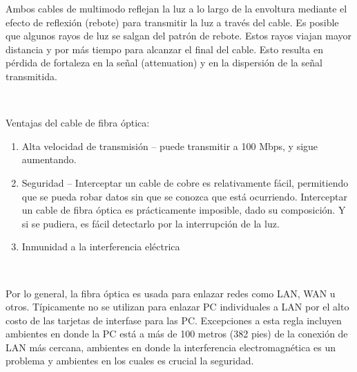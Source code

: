 \documentclass[a4paper]{article}
\begin{document}
Ambos cables de multimodo reflejan la luz a lo largo de la envoltura
mediante el efecto de reflexión (rebote) para transmitir la luz a través
del cable. Es posible que algunos rayos de luz se salgan del patrón de
rebote. Estos rayos viajan mayor distancia y por más tiempo para
alcanzar el final del cable. Esto resulta en pérdida de fortaleza en la
señal (attenuation) y en la dispersión de la señal transmitida.

~

Ventajas del cable de fibra óptica:

\begin{enumerate}
\def\labelenumi{\arabic{enumi}.}
\item
  Alta velocidad de transmisión -- puede transmitir a 100 Mbps, y sigue
  aumentando.
\item
  Seguridad -- Interceptar un cable de cobre es relativamente fácil,
  permitiendo que se pueda robar datos sin que se conozca que está
  ocurriendo. Interceptar un cable de fibra óptica es prácticamente
  imposible, dado su composición. Y si se pudiera, es fácil detectarlo
  por la interrupción de la luz.
\item
  Inmunidad a la interferencia eléctrica
\end{enumerate}

~

Por lo general, la fibra óptica es usada para enlazar redes como LAN,
WAN u otros. Típicamente no se utilizan para enlazar PC individuales a
LAN por el alto costo de las tarjetas de interfase para las PC.
Excepciones a esta regla incluyen ambientes en donde la PC está a más de
100 metros (382 pies) de la conexión de LAN más cercana, ambientes en
donde la interferencia electromagnética es un problema y ambientes en
los cuales es crucial la seguridad.

\noindent{}
\end{document}
